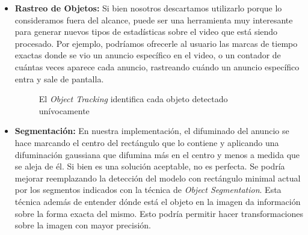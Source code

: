 \documentclass[a4paper]{article}
\begin{document}
\begin{itemize}
\item \textbf{Rastreo de Objetos:} Si bien nosotros descartamos utilizarlo porque lo consideramos fuera del alcance, puede ser una herramienta muy interesante para generar nuevos tipos de estadísticas sobre el video que está siendo procesado. Por ejemplo, podríamos ofrecerle al usuario las marcas de tiempo exactas donde se vio un anuncio específico en el video, o un contador de cuántas veces aparece cada anuncio, rastreando cuándo un anuncio específico entra y sale de pantalla.


\begin{figure}[H]
\caption{El \textit{Object Tracking} identifica cada objeto detectado unívocamente}
\end{figure}

\item \textbf{Segmentación:} En nuestra implementación, el difuminado del anuncio se hace marcando el centro del rectángulo que lo contiene y aplicando una difuminación gaussiana que difumina más en el centro y menos a medida que se aleja de él. Si bien es una solución aceptable, no es perfecta. Se podría mejorar reemplazando la detección del modelo con rectángulo minimal actual por los segmentos indicados con la técnica de \textit{Object Segmentation}. Esta técnica además de entender dónde está el objeto en la imagen da información sobre la forma exacta del mismo. Esto podría permitir hacer transformaciones sobre la imagen con mayor precisión.


\end{itemize}
\end{document}
